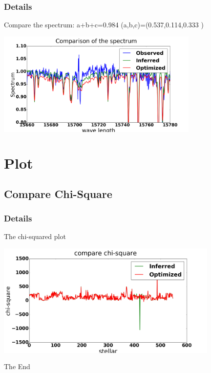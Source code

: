 \documentclass{beamer}
\begin{document}
\begin{frame}
\frametitle{Details}
 
Compare the spectrum: a+b+c=0.984  (a,b,c)=(0.537,0.114,0.333 )


\includegraphics[width=100mm]{figure_1.png}




\end{frame}


\section{Plot} %

\subsection{Compare Chi-Square} %

\begin{frame}
\frametitle{Details}
 
The chi-squared plot

\includegraphics[width=110mm]{parameter.png}


\end{frame}



\begin{frame}
\Huge{\centerline{The End}}
\end{frame}

\end{document}
